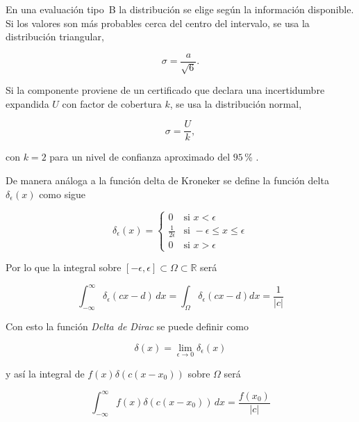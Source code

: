 En una evaluación tipo~B la distribución se elige según la información
disponible. Si los valores son más probables cerca del centro del intervalo, se
usa la distribución triangular,

\begin{equation}
    \sigma = \frac{a}{\sqrt{6}}.
    \label{eq:sigma-triangular}
\end{equation}

Si la componente proviene de un certificado que declara una incertidumbre
expandida $U$ con factor de cobertura $k$, se usa la distribución normal,

\begin{equation}
    \sigma = \frac{U}{k},
    \label{eq:sigma-normal}
\end{equation}

con $k=2$ para un nivel de confianza aproximado del $95$\,\%
\parencite{jcgm2008gum}.

De manera análoga a la función delta de Kroneker se define
la función delta $\delta_\epsilon(x)$ como sigue

\begin{equation}
  \delta_\epsilon (x) =
  \begin{cases}
    0 & \text{si } x < \epsilon\\
    \frac{1}{2\epsilon} & \text{si } -\epsilon \leq x \leq \epsilon\\
    0 & \text{si } x > \epsilon
  \end{cases}
  \label{eq:delta}
\end{equation}

Por lo que la integral sobre $[-\epsilon, \epsilon] \subset
\Omega \subset \mathbb R$ será

\begin{equation}
  \int_{-\infty}^\infty \delta_\epsilon(cx - d)\, dx = \int_\Omega
  \delta_\epsilon(cx - d) dx = \frac{1}{|c|}
  \label{eq:delta-integral}
\end{equation}

Con esto la función \textit{Delta de Dirac} se puede definir como

\begin{equation}
  \delta(x) = \lim_{\epsilon \to 0} \delta_\epsilon(x)
  \label{eq:delta-dirac}
\end{equation}

y así la integral de $f(x)\delta(c(x - x_0))$ sobre $\Omega$ será

\begin{equation}
  \int_{-\infty}^\infty f(x)\delta(c(x - x_0))\,dx = \frac{f(x_0)}{|c|}
  \label{eq:dalta-dirac-integral}
\end{equation}

